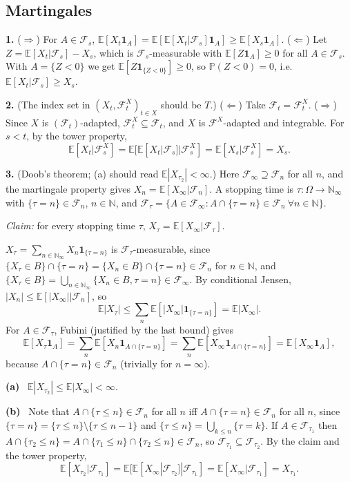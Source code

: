 \documentclass[11pt,a4paper]{article}
\newcommand{\E}{\mathbb{E}}
\renewcommand{\P}{\mathbb{P}}
\newcommand{\N}{\mathbb{N}}
\newcommand{\F}{\mathcal{F}}
\newcommand{\1}{\mathbf{1}}
\newcommand{\prob}[1]{\par\medskip\noindent\textbf{#1}\quad}
\newcommand{\sub}[1]{\par\smallskip\noindent\textbf{#1}\ }
\begin{document}
\subsection*{Martingales}

\prob{1.}
($\Rightarrow$) For $A\in\F_s$, $\E[X_t\1_A]=\E[\E[X_t|\F_s]\1_A]\ge\E[X_s\1_A]$.
($\Leftarrow$) Let $Z=\E[X_t|\F_s]-X_s$, which is $\F_s$-measurable with $\E[Z\1_A]\ge0$ for all $A\in\F_s$.
With $A=\{Z<0\}$ we get $\E[Z\1_{\{Z<0\}}]\ge0$, so $\P(Z<0)=0$, i.e.\ $\E[X_t|\F_s]\ge X_s$.

\prob{2.}
(The index set in $(X_t,\F^X_t)_{t\in X}$ should be $T$.) ($\Leftarrow$) Take $\F_t=\F^X_t$.
($\Rightarrow$) Since $X$ is $(\F_t)$-adapted, $\F^X_t\subseteq\F_t$, and $X$ is $\F^X$-adapted and integrable.
For $s<t$, by the tower property,
\[\E[X_t|\F^X_s]=\E[\E[X_t|\F_s]|\F^X_s]=\E[X_s|\F^X_s]=X_s.\]

\prob{3.}
(Doob's theorem; (a) should read $\E|X_{\tau_2}|<\infty$.) Here $\F_\infty\supseteq\F_n$ for all $n$, and the martingale
property gives $X_n=\E[X_\infty|\F_n]$. A stopping time is $\tau:\Omega\to\N_\infty$ with $\{\tau=n\}\in\F_n$, $n\in\N$, and
$\F_\tau=\{A\in\F_\infty:A\cap\{\tau=n\}\in\F_n\ \forall n\in\N\}$.

\emph{Claim:} for every stopping time $\tau$, $X_\tau=\E[X_\infty|\F_\tau]$.

$X_\tau=\sum_{n\in\N_\infty}X_n\1_{\{\tau=n\}}$ is $\F_\tau$-measurable, since
$\{X_\tau\in B\}\cap\{\tau=n\}=\{X_n\in B\}\cap\{\tau=n\}\in\F_n$ for $n\in\N$, and
$\{X_\tau\in B\}=\bigcup_{n\in\N_\infty}\{X_n\in B,\tau=n\}\in\F_\infty$. By conditional Jensen, $|X_n|\le\E[|X_\infty||\F_n]$, so
\[\E|X_\tau|\le\sum_n\E[|X_\infty|\1_{\{\tau=n\}}]=\E|X_\infty|.\]
For $A\in\F_\tau$, Fubini (justified by the last bound) gives
\[\E[X_\tau\1_A]=\sum_n\E[X_n\1_{A\cap\{\tau=n\}}]=\sum_n\E[X_\infty\1_{A\cap\{\tau=n\}}]=\E[X_\infty\1_A],\]
because $A\cap\{\tau=n\}\in\F_n$ (trivially for $n=\infty$).

\sub{(a)} $\E|X_{\tau_2}|\le\E|X_\infty|<\infty$.

\sub{(b)} Note that $A\cap\{\tau\le n\}\in\F_n$ for all $n$ iff $A\cap\{\tau=n\}\in\F_n$ for all $n$, since
$\{\tau=n\}=\{\tau\le n\}\setminus\{\tau\le n-1\}$ and $\{\tau\le n\}=\bigcup_{k\le n}\{\tau=k\}$. If $A\in\F_{\tau_1}$ then $A\cap\{\tau_2\le n\}=A\cap\{\tau_1\le n\}\cap\{\tau_2\le n\}\in\F_n$, so
$\F_{\tau_1}\subseteq\F_{\tau_2}$. By the claim and the tower property,
\[\E[X_{\tau_2}|\F_{\tau_1}]=\E[\E[X_\infty|\F_{\tau_2}]|\F_{\tau_1}]=\E[X_\infty|\F_{\tau_1}]=X_{\tau_1}.\]
\end{document}
